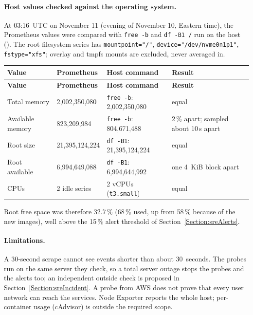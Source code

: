 \paragraph{Host values checked against the operating system.} At 03:16~UTC on November 11 (evening of November 10,
Eastern time), the Prometheus values were compared with \texttt{free -b} and \texttt{df -B1 /} run on the host
(). The root filesystem series has \texttt{mountpoint="/"}, \texttt{device="/dev/nvme0n1p1"}, \texttt{fstype="xfs"};
overlay and tmpfs mounts are excluded, never averaged in.

\begin{tabularx}{\linewidth}{L{3.6cm}L{3.4cm}L{3.4cm}Y}
\caption{Prometheus compared with the host\label{Table:SreHostCheck}}\\
\toprule \textbf{Value} & \textbf{Prometheus} & \textbf{Host command} & \textbf{Result}\\ \midrule
\endfirsthead
\toprule \textbf{Value} & \textbf{Prometheus} & \textbf{Host command} & \textbf{Result}\\ \midrule
\endhead \bottomrule \endlastfoot
Total memory & 2,002,350,080 & \texttt{free -b}: 2,002,350,080 & equal\\
Available memory & 823,209,984 & \texttt{free -b}: 804,671,488 & 2\,\% apart; sampled about 10\,s apart\\
Root size & 21,395,124,224 & \texttt{df -B1}: 21,395,124,224 & equal\\
Root available & 6,994,649,088 & \texttt{df -B1}: 6,994,644,992 & one 4~KiB block apart\\
CPUs & 2 idle series & 2 vCPUs (\texttt{t3.small}) & equal\\
\end{tabularx}

Root free space was therefore 32.7\,\% (68\,\% used, up from 58\,\% because of the new images), well above the 15\,\%
alert threshold of Section~\ref{Section:sreAlerts}.

\paragraph{Limitations.} A 30-second scrape cannot see events shorter than about 30~seconds. The probes run on the same
server they check, so a total server outage stops the probes and the alerts too; an independent outside check is proposed
in Section~\ref{Section:sreIncident}. A probe from AWS does not prove that every user network can reach the services.
Node Exporter reports the whole host; per-container usage (cAdvisor) is outside the required scope.

